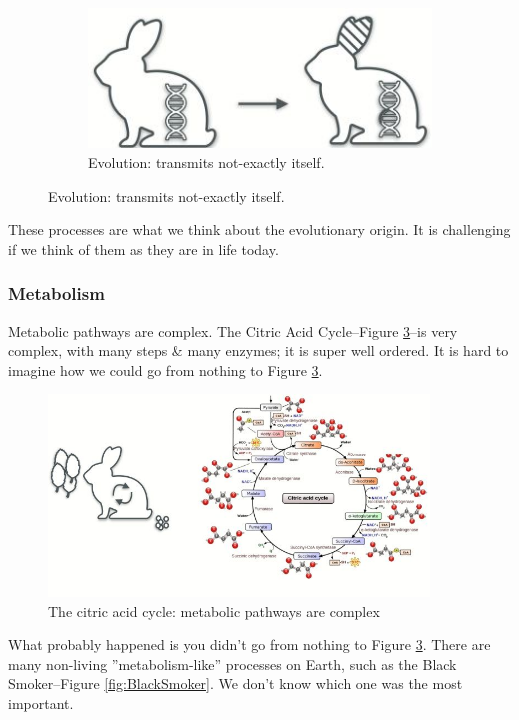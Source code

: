 \documentclass[]{article}
\begin{document}
\begin{figure}[H]
\begin{subfigure}[t]{0.3\textwidth}
	\end{subfigure}
	\;\;
	\begin{subfigure}[t]{0.3\textwidth}
		\caption{Evolution: transmits not-exactly itself.}\label{fig:EvolutionaryOrigin3}
		\includegraphics[width=\textwidth]{EvolutionaryOrigin3}
	\end{subfigure}
\end{figure}

These processes are what we think about the evolutionary origin. It is challenging if we think of them as they are in life today.

\subsubsection{Metabolism}

Metabolic pathways are complex. The Citric Acid Cycle--Figure \ref{fig:CitricAcidCycle}--is very complex, with many steps \& many enzymes; it is super well ordered. It is hard to imagine how we could go from nothing to Figure \ref{fig:CitricAcidCycle}.

\begin{figure}[H]
	\caption{The citric acid cycle: metabolic pathways are complex}\label{fig:CitricAcidCycle}
	\includegraphics[width=0.9\textwidth]{CitricAcidCycle}
\end{figure}

 What probably happened is you didn't go from nothing to  Figure \ref{fig:CitricAcidCycle}.  There are many non-living ''metabolism-like'' processes on Earth, such as the Black Smoker--Figure \ref{fig:BlackSmoker}. We don't know which one was the most important.
 
\end{document}
